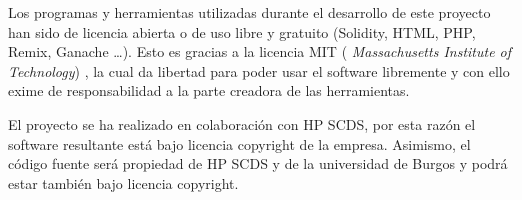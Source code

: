 Los programas y herramientas utilizadas durante el desarrollo de este proyecto han sido de licencia abierta o de uso libre y gratuito (Solidity, HTML, PHP, Remix, Ganache \ldots). Esto es gracias a la licencia MIT ( \textit{Massachusetts Institute of Technology}) \cite{MIT}, la cual da libertad para poder usar el software libremente y con ello exime de responsabilidad a la parte creadora de las herramientas.
	
El proyecto se ha realizado en colaboración con HP SCDS, por esta razón el software resultante está bajo licencia copyright de la empresa. Asimismo, el código fuente será propiedad de HP SCDS y de la universidad de Burgos y podrá estar también bajo licencia copyright.
